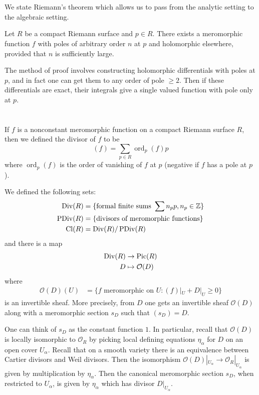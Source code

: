 \documentclass[12pt]{article}
\begin{document}
\section{}
We state Riemann's theorem which allows us to pass from the analytic setting to the algebraic setting.
\begin{theorem}
    Let $R$ be a compact Riemann surface and $p\in R$. There exists a meromorphic function $f$ with poles of arbitrary order $n$ at $p$ and holomorphic elsewhere, provided that $n$ is sufficiently large.
\end{theorem}

The method of proof involves constructing holomorphic differentials with poles at $p$, and in fact one can get them to any order of pole $\geq 2$. Then if these differentials are exact, their integrals give a single valued function with pole only at $p$.

\section{}
If $f$ is a nonconstant meromorphic function on a compact Riemann surface $R$, then we defined the divisor of $f$ to be \[(f) = \sum_{p \in R} \operatorname{ord}_p(f) p\] where $\operatorname{ord}_p(f)$ is the order of vanishing of $f$ at $p$ (negative if $f$ has a pole at $p$). 

We defined the following sets:
\begin{align*}
    \operatorname{Div}(R) & = \{\text{formal finite sums } \sum n_p p, n_p \in \mathbb{Z}\} \\
    \operatorname{PDiv}(R) & = \{\text{divisors of meromorphic functions}\} \\
    \operatorname{Cl}(R) & = \operatorname{Div}(R)/\operatorname{PDiv}(R)
\end{align*} and there is a map \begin{align*}
    \operatorname{Div}(R) & \to \operatorname{Pic}(R) \\
    D & \mapsto \mathcal{O}(D)
\end{align*} where \begin{align*}
    \mathcal{O}(D)(U) & = \{f \text{ meromorphic on } U : (f)|_U + D|_U \geq 0\}
\end{align*} is an invertible sheaf. More precisely, from $D$ one gets an invertible sheaf $\mathcal{O}(D)$ along with a meromorphic section $s_D$ such that $(s_D)=D$. 

One can think of $s_D$ as the constant function $1$. In particular, recall that $\mathcal{O}(D)$ is locally isomorphic to $\mathcal{O}_R$ by picking local defining equations $\eta_\alpha$ for $D$ on an open cover $U_\alpha$. Recall that on a smooth variety there is an equivalence between Cartier divisors and Weil divisors.
Then the isomorphism $\mathcal{O}(D)|_{U_\alpha} \to \mathcal{O}_R|_{U_\alpha}$ is given by multiplication by $\eta_\alpha$. Then the canonical meromorphic section $s_D$, when restricted to $U_\alpha$, is given by $\eta_\alpha$ which has divisor $D|_{U_\alpha}$.
\end{document}
